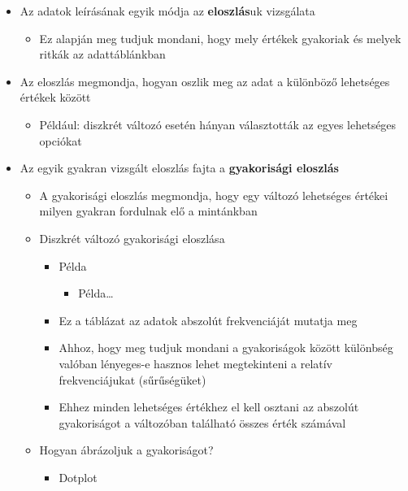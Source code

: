 \documentclass[
  letterpaper,
  DIV=11,
  numbers=noendperiod]{scrreprt}
\providecommand{\tightlist}{%
  \setlength{\itemsep}{0pt}\setlength{\parskip}{0pt}}\usepackage{longtable,booktabs,array}
\begin{document}
\begin{itemize}
\item
  Az adatok leírásának egyik módja az \textbf{eloszlás}uk vizsgálata

  \begin{itemize}
  \tightlist
  \item
    Ez alapján meg tudjuk mondani, hogy mely értékek gyakoriak és melyek
    ritkák az adattáblánkban
  \end{itemize}
\item
  Az eloszlás megmondja, hogyan oszlik meg az adat a különböző
  lehetséges értékek között

  \begin{itemize}
  \tightlist
  \item
    Például: diszkrét változó esetén hányan választották az egyes
    lehetséges opciókat
  \end{itemize}
\item
  Az egyik gyakran vizsgált eloszlás fajta a \textbf{gyakorisági
  eloszlás}

  \begin{itemize}
  \item
    A gyakorisági eloszlás megmondja, hogy egy változó lehetséges
    értékei milyen gyakran fordulnak elő a mintánkban
  \item
    Diszkrét változó gyakorisági eloszlása

    \begin{itemize}
    \item
      Példa

      \begin{itemize}
      \tightlist
      \item
        Példa\ldots{}
      \end{itemize}
    \item
      Ez a táblázat az adatok abszolút frekvenciáját mutatja meg
    \item
      Ahhoz, hogy meg tudjuk mondani a gyakoriságok között különbség
      valóban lényeges-e hasznos lehet megtekinteni a relatív
      frekvenciájukat (sűrűségüket)
    \item
      Ehhez minden lehetséges értékhez el kell osztani az abszolút
      gyakoriságot a változóban található összes érték számával
    \end{itemize}
  \item
    Hogyan ábrázoljuk a gyakoriságot?

    \begin{itemize}
    \item
      Dotplot


\end{itemize}
\end{itemize}
\end{itemize}
\end{document}
